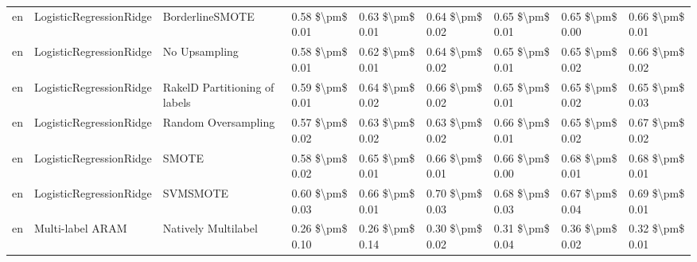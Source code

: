 \begin{tabular}{lllllllll}
      en &         LogisticRegressionRidge &               BorderlineSMOTE & 0.58 \$\textbackslash pm\$ 0.01 &           0.63 \$\textbackslash pm\$ 0.01 &       0.64 \$\textbackslash pm\$ 0.02 &        0.65 \$\textbackslash pm\$ 0.01 &                         0.65 \$\textbackslash pm\$ 0.00 &     0.66 \$\textbackslash pm\$ 0.01 \\
      en &         LogisticRegressionRidge &                 No Upsampling & 0.58 \$\textbackslash pm\$ 0.01 &           0.62 \$\textbackslash pm\$ 0.01 &       0.64 \$\textbackslash pm\$ 0.02 &        0.65 \$\textbackslash pm\$ 0.01 &                         0.65 \$\textbackslash pm\$ 0.02 &     0.66 \$\textbackslash pm\$ 0.02 \\
      en &         LogisticRegressionRidge & RakelD Partitioning of labels & 0.59 \$\textbackslash pm\$ 0.01 &           0.64 \$\textbackslash pm\$ 0.02 &       0.66 \$\textbackslash pm\$ 0.02 &        0.65 \$\textbackslash pm\$ 0.01 &                         0.65 \$\textbackslash pm\$ 0.02 &     0.65 \$\textbackslash pm\$ 0.03 \\
      en &         LogisticRegressionRidge &           Random Oversampling & 0.57 \$\textbackslash pm\$ 0.02 &           0.63 \$\textbackslash pm\$ 0.02 &       0.63 \$\textbackslash pm\$ 0.02 &        0.66 \$\textbackslash pm\$ 0.01 &                         0.65 \$\textbackslash pm\$ 0.02 &     0.67 \$\textbackslash pm\$ 0.02 \\
      en &         LogisticRegressionRidge &                         SMOTE & 0.58 \$\textbackslash pm\$ 0.02 &           0.65 \$\textbackslash pm\$ 0.01 &       0.66 \$\textbackslash pm\$ 0.01 &        0.66 \$\textbackslash pm\$ 0.00 &                         0.68 \$\textbackslash pm\$ 0.01 &     0.68 \$\textbackslash pm\$ 0.01 \\
      en &         LogisticRegressionRidge &                      SVMSMOTE & 0.60 \$\textbackslash pm\$ 0.03 &           0.66 \$\textbackslash pm\$ 0.01 &       0.70 \$\textbackslash pm\$ 0.03 &        0.68 \$\textbackslash pm\$ 0.03 &                         0.67 \$\textbackslash pm\$ 0.04 &     0.69 \$\textbackslash pm\$ 0.01 \\
      en &                Multi-label ARAM &           Natively Multilabel & 0.26 \$\textbackslash pm\$ 0.10 &           0.26 \$\textbackslash pm\$ 0.14 &       0.30 \$\textbackslash pm\$ 0.02 &        0.31 \$\textbackslash pm\$ 0.04 &                         0.36 \$\textbackslash pm\$ 0.02 &     0.32 \$\textbackslash pm\$ 0.01 \\

\end{tabular}
